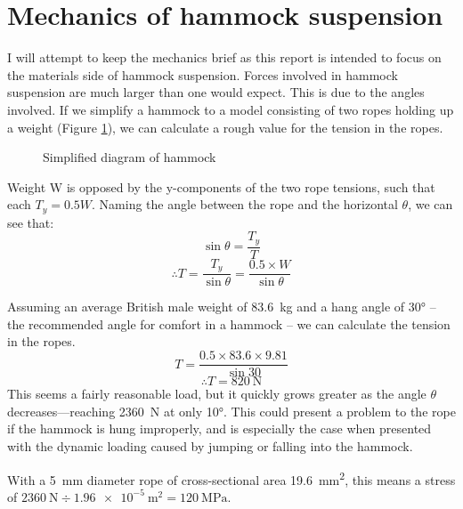 \section{Mechanics of hammock suspension}
\label{sec:mechanics}
I will attempt to keep the mechanics brief as this report is intended to focus on the materials side of hammock suspension. Forces involved in hammock suspension are much larger than one would expect. This is due to the angles involved. If we simplify a hammock to a model consisting of two ropes holding up a weight (Figure \ref{fig:hammock}), we can calculate a rough value for the tension in the ropes.

\begin{figure}
\centering
{}
\caption{Simplified diagram of hammock}
\label{fig:hammock}
\end{figure}

Weight W is opposed by the y-components of the two rope tensions, such that each $T_y = 0.5W$. Naming the angle between the rope and the horizontal $\theta$, we can see that:
$$\sin\theta = \frac{T_y}{T}$$
$$\therefore T = \frac{T_y}{\sin\theta} = \frac{0.5 \times W}{\sin\theta}$$

Assuming an average British male weight of \SI{83.6}{\kilogram}  and a hang angle of \ang{30} -- the recommended angle for comfort in a hammock  -- we can calculate the tension in the ropes.
$$T = \frac{0.5 \times 83.6 \times 9.81}{\sin30}$$
$$\therefore T = \SI{820}{\newton}$$
This seems a fairly reasonable load, but it quickly grows greater as the angle $\theta$ decreases---reaching \SI{2360}{\newton} at only \ang{10}. This could present a problem to the rope if the hammock is hung improperly, and is especially the case when presented with the dynamic loading caused by jumping or falling into the hammock.

With a \SI{5}{\milli\metre} diameter rope of cross-sectional area \SI{19.6}{\milli\metre\squared}, this means a stress of $\SI{2360}{\newton} \div \SI{1.96e-5}{\metre\squared} = \SI{120}{\mega\pascal}$.


